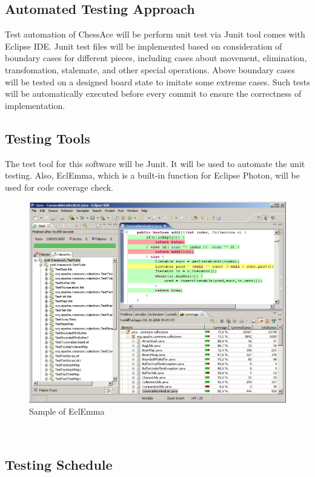 \documentclass[12pt, titlepage]{article}
\begin{document}
\subsection{Automated Testing Approach}
Test automation of ChessAce will be perform unit test via Junit tool comes with Eclipse IDE. Junit test files will be implemented based on consideration of boundary cases for different pieces, including cases about movement, elimination, transfomation, stalemate, and other special operations. Above boundary cases will be tested on a designed board state to imitate some extreme cases. Such tests will be automatically executed before every commit to ensure the correctness of implementation.

\subsection{Testing Tools}
The test tool for this software will be Junit. It will be used to automate the unit testing. Also, EclEmma, which is a built-in function for Eclipse Photon, will be used for code coverage check.
\begin{figure}[h]
  \includegraphics[width=\linewidth]{screen.png}
  \caption{Sample of EclEmma}
  \label{fig:Ecl}
\end{figure}~\cite{EclEmma}

\subsection{Testing Schedule}
\end{document}
